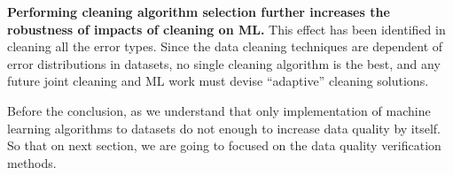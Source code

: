 \textbf{Performing cleaning algorithm selection further increases the robustness of impacts of cleaning on ML. }This effect has been identified in cleaning all the error types. Since the data cleaning techniques are dependent of error distributions in datasets, no single cleaning algorithm is the best, and any future joint cleaning and
ML work must devise “adaptive” cleaning solutions.

Before the conclusion, as we understand that only implementation of machine learning algorithms to datasets do not enough to increase data quality by itself. So that on next section, we are going to focused on the data quality verification methods.  




